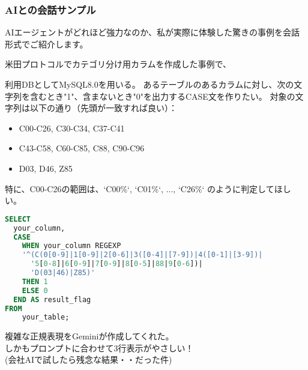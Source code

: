 \documentclass[uplatex,dvipdfmx,9pt,a4paper]{beamer}
\begin{document}
\begin{frame}
  \frametitle{AIとの会話サンプル}

  AIエージェントがどれほど強力なのか、私が実際に体験した驚きの事例を会話形式でご紹介します。\\
  \vspace{0.5cm}

  米田プロトコルでカテゴリ分け用カラムを作成した事例で、
  \begin{mychat}
    利用DBとしてMySQL8.0を用いる。
    あるテーブルのあるカラムに対し、次の文字列を含むとき"1"、含まないとき"0"を出力するCASE文を作りたい。
    対象の文字列は以下の通り（先頭が一致すれば良い）：
    \begin{itemize}
        \item C00-C26, C30-C34, C37-C41
        \item C43-C58, C60-C85, C88, C90-C96
        \item D03, D46, Z85
    \end{itemize}
    特に、C00-C26の範囲は、`C00\%`, `C01\%`, ..., `C26\%` のように判定してほしい。
  \end{mychat}

  \begin{aichat}
    \begin{lstlisting}[language=SQL, basicstyle=\scriptsize\ttfamily, frame=none, upquote=true]
SELECT
  your_column,
  CASE
    WHEN your_column REGEXP
    '^(C(0[0-9]|1[0-9]|2[0-6]|3([0-4]|[7-9])|4([0-1]|[3-9])|
      '5[0-8]|6[0-9]|7[0-9]|8[0-5]|88|9[0-6])|
      'D(03|46)|Z85)'
    THEN 1
    ELSE 0
  END AS result_flag
FROM
    your_table;
\end{lstlisting}
  \end{aichat}

  複雑な正規表現をGeminiが作成してくれた。\\
  しかもプロンプトに合わせて3行表示がやさしい！\\
  (会社AIで試したら残念な結果・・だった件)

\end{frame}
\end{document}
